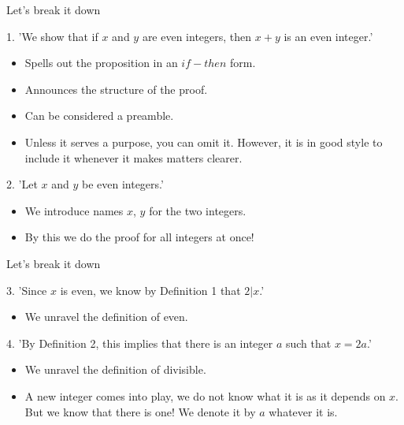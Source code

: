 \documentclass{beamer}
\begin{document}
\begin{frame}{Let's break it down}
\begin{block}{}
1. 'We show that if $x$ and $y$ are even integers, then $x+y$ is an even integer.'
\end{block}\pause
\begin{itemize}
\item Spells out the proposition in an $if-then$ form.\pause
\item Announces the structure of the proof.\pause
\item Can be considered a preamble.\pause
\item Unless it serves a purpose, you can omit it. However, it is in good style to include it whenever it makes matters clearer.
\end{itemize}\pause

\begin{block}{}
2. 'Let $x$ and $y$ be even integers.'
\end{block}\pause

\begin{itemize}
\item We introduce names $x$, $y$ for the two integers.\pause
\item By this we do the proof for all integers at once!
\end{itemize}

\end{frame}

\begin{frame}{Let's break it down}
\begin{block}{}
3. 'Since $x$ is even, we know by Definition 1 that $2|x$.'
\end{block}\pause
\begin{itemize}
\item We unravel the definition of even.
\end{itemize}\pause

\begin{block}{}
4. 'By Definition 2, this implies that there is an integer $a$ such that $x=2a$.'
\end{block}\pause
\begin{itemize}
\item We unravel the definition of divisible.\pause
\item A new integer comes into play, we do not know what it is as it depends on $x$. But we know that there is one! We denote it by $a$ whatever it is.
\end{itemize}

\end{frame}
\end{document}
